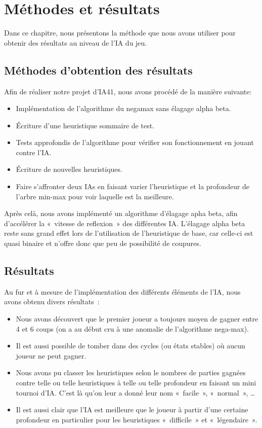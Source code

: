 \chapter{Méthodes et résultats}\label{chapter:methodes-resultats}

Dans ce chapitre, nous présentons la méthode que nous avons utiliser pour obtenir des résultats au niveau de l'IA du jeu.

\section{Méthodes d'obtention des résultats}

Afin de réaliser notre projet d'IA41, nous avons procédé de la manière suivante:

\begin{itemize}
    \item Implémentation de l'algorithme du negamax sans élagage alpha beta.
    \item Écriture d'une heuristique sommaire de test.
    \item Tests approfondis de l'algorithme pour vérifier son fonctionnement en jouant contre l'IA\@.
    \item Écriture de nouvelles heuristiques.
    \item Faire s'affronter deux IAs en faisant varier l'heuristique et la profondeur de l'arbre min-max pour voir laquelle est
        la meilleure.
\end{itemize}

Après celà, nous avons implémenté un algorithme d'élagage apha beta, afin d'accélérer la « vitesse de reflexion » des différentes
IA\@. L'élagage alpha beta reste sans grand effet lors de l'utilisation de l'heuristique de base, car celle-ci est quasi binaire
et n'offre donc que peu de possibilité de coupures.

\section{Résultats}

Au fur et à mesure de l'implémentation des différents éléments de l'IA, nous avons obtenu divers résultats :

\begin{itemize}
    \item Nous avons découvert que le premier joueur a toujours moyen de gagner entre 4 et 6 coups
        (on a au début cru à une anomalie de l'algorithme nega-max).
    \item Il est aussi possible de tomber dans des cycles (ou états stables) où aucun joueur ne peut gagner.
    \item Nous avons pu classer les heuristiques selon le nombres de parties gagnées contre telle ou telle heuristiques à
        telle ou telle profondeur en faisant un mini tournoi d'IA\@. C'est là qu'on leur a donné leur nom « facile », « normal », …
    \item Il est aussi clair que l'IA est meilleure que le joueur à partir d'une certaine profondeur en particulier pour les
        heuristiques « difficile » et « légendaire ».
\end{itemize}

